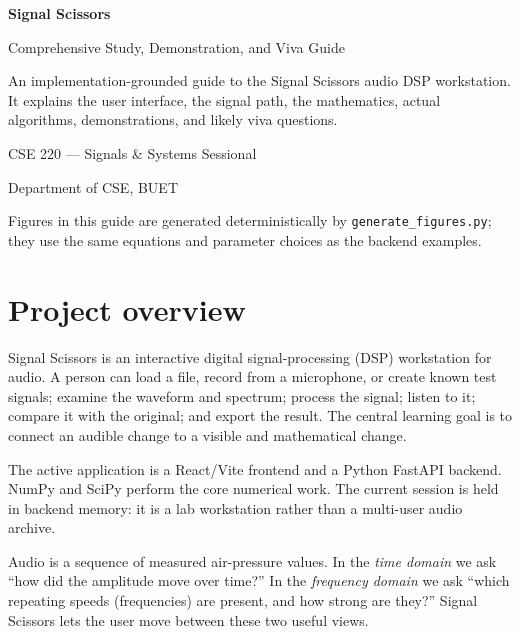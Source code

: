 \documentclass[11pt,a4paper]{article}
\newcommand{\code}[1]{\texttt{#1}}
\begin{document}
\begin{titlepage}
\centering
\vspace*{2.5cm}
{\sffamily\fontsize{30}{36}\selectfont\bfseries Signal Scissors\par}
\vspace{0.35cm}
{\sffamily\Large Comprehensive Study, Demonstration, and Viva Guide\par}
\vspace{1.2cm}
\begin{tcolorbox}[width=.88\textwidth,colback=soft,colframe=blue!65!black]
An implementation-grounded guide to the Signal Scissors audio DSP workstation. It explains the user interface, the signal path, the mathematics, actual algorithms, demonstrations, and likely viva questions.
\end{tcolorbox}
\vfill
{\large CSE 220 --- Signals \& Systems Sessional\par}
{\large Department of CSE, BUET\par}
\vspace{0.6cm}
{\small Figures in this guide are generated deterministically by \code{generate\_figures.py}; they use the same equations and parameter choices as the backend examples.\par}
\end{titlepage}

\tableofcontents
\newpage

\section{Project overview}
Signal Scissors is an interactive digital signal-processing (DSP) workstation for audio. A person can load a file, record from a microphone, or create known test signals; examine the waveform and spectrum; process the signal; listen to it; compare it with the original; and export the result. The central learning goal is to connect an audible change to a visible and mathematical change.

The active application is a React/Vite frontend and a Python FastAPI backend. NumPy and SciPy perform the core numerical work. The current session is held in backend memory: it is a lab workstation rather than a multi-user audio archive.

\begin{intuitive}
Audio is a sequence of measured air-pressure values. In the \emph{time domain} we ask ``how did the amplitude move over time?'' In the \emph{frequency domain} we ask ``which repeating speeds (frequencies) are present, and how strong are they?'' Signal Scissors lets the user move between these two useful views.
\end{intuitive}
\end{document}
